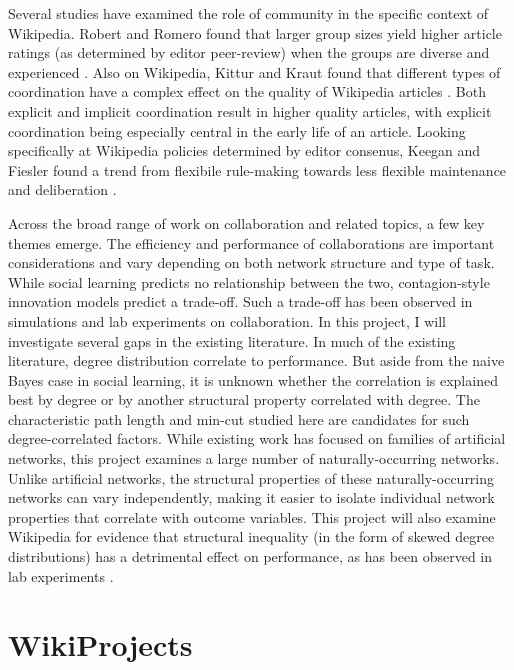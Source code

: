 Several studies have examined the role of community in the specific context
of Wikipedia.
Robert and Romero found that
larger group sizes yield higher article ratings
(as determined by editor peer-review)
when the groups are diverse and experienced
\cite{robert_crowd_2015}.
Also on Wikipedia,
Kittur and Kraut found that different types of coordination have a complex
effect on the quality of Wikipedia articles \cite{kittur_harnessing_2008}.
Both explicit and implicit coordination result in higher quality articles,
with explicit coordination being especially central in the early life of an
article.
Looking specifically at Wikipedia policies determined by editor consenus,
Keegan and Fiesler found a trend
from flexibile rule-making towards less flexible maintenance and deliberation
\cite{keegan_evolution_2017}.

Across the broad range of work on collaboration and related topics,
a few key themes emerge.
The efficiency and performance of collaborations are important considerations
and vary depending on both network structure and type of task.
While social learning predicts no relationship between the two,
contagion-style innovation models predict a trade-off.
Such a trade-off has been observed in simulations and lab experiments on
collaboration.
In this project, I will investigate several gaps in the existing literature.
In much of the existing literature,
degree distribution correlate to performance.
But aside from the naive Bayes case in social learning, it is unknown whether
the correlation is explained best by degree or by another structural property
correlated with degree.
The characteristic path length and min-cut studied here are candidates for such
degree-correlated factors.
While existing work has focused on families of artificial networks,
this project examines a large number of naturally-occurring networks.
Unlike artificial networks, the structural properties of these naturally-occurring
networks can vary independently, making it easier to isolate individual
network properties that correlate with outcome variables.
This project will also examine Wikipedia for evidence that structural
inequality (in the form of skewed
degree distributions) has a detrimental effect on performance,
as has been observed in lab experiments
\mbox{\cite{kearns_experiments_2012}}.

\section{WikiProjects}
\label{sec:wp}

